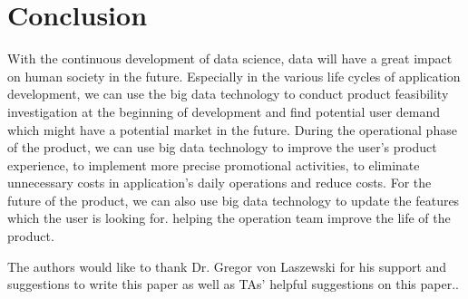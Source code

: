 \documentclass[sigconf]{acmart}
\begin{document}
\section{Conclusion}
With the continuous development of data science, data will have a great impact on human society in the future.  Especially in the various life cycles of application development, we can use the big data technology to conduct product feasibility investigation at the beginning of development and find potential user demand which might have a potential market in the future. During the operational phase of the product, we can use big data technology to improve the user's product experience, to implement more precise promotional activities, to eliminate unnecessary costs in application's daily operations and reduce costs. For the future of the product, we can also use big data technology to update the features which the user is looking for. helping the operation team improve the life of the product.


\begin{acks}

  The authors would like to thank Dr. Gregor von Laszewski for his support and suggestions to write this paper as well as TAs' helpful suggestions on this paper.. 

\end{acks}


 
\end{document}
